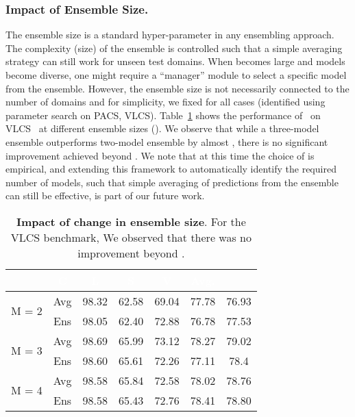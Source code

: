 \subsubsection{Impact of Ensemble Size.} The ensemble size  is a standard hyper-parameter in any ensembling approach. The complexity (size) of the ensemble is controlled such that a simple averaging strategy can still work for unseen test domains. When  becomes large and models become diverse, one might require a ``manager'' module to select a specific model from the ensemble. However, the ensemble size is not necessarily connected to the number of domains and for simplicity, we fixed  for all cases (identified using parameter search on PACS, VLCS). Table~\ref{tab:change_m} shows the performance of \muld~on VLCS~\citep{VLCS} at different ensemble sizes ().
We observe that while a three-model ensemble outperforms two-model ensemble by almost , there is no significant improvement achieved beyond . We note that at this time the choice of  is empirical, and extending this framework to automatically identify the required number of models, such that simple averaging of predictions from the ensemble can still be effective, is part of our future work.
\begin{table}[h!]
    \centering
    \caption{\textbf{Impact of change in ensemble size}. For the VLCS benchmark, We observed that there was no improvement beyond .}
    \label{tab:change_m}
    \renewcommand{\arraystretch}{1.2}
  
\begin{tabular}{|c|c|c|c|c|c|c|}
    \hline
     \rowcolor[HTML]{404040}
    \multicolumn{2}{|c|}{\textcolor{white}{Choice of M}}  & \textcolor{white}{C}          & \textcolor{white}{L}          & \textcolor{white}{S}          & \textcolor{white}{V}      & \textcolor{white}{Avg.}  \\
    \hline
    \hline
    \multirow{2}{*}{ M = 2 } & Avg & 98.32 & 62.58 & 69.04 & 77.78 & 76.93 \\
    & Ens & 98.05 & 62.40 & 72.88 & 76.78 & 77.53 \\\hline
    \multirow{2}{*}{ M = 3 } & Avg & 98.69  & 65.99  &73.12 &78.27 &79.02  \\
    & Ens & 98.60 & 65.61 &72.26 & 77.11 & 78.4\\\hline
    \multirow{2}{*}{ M = 4 } & Avg & 98.58 & 65.84 & 72.58 & 78.02 & 78.76 \\
    & Ens & 98.58 & 65.43 & 72.76 & 78.41 & 78.80 \\\hline
    \end{tabular}
\end{table}